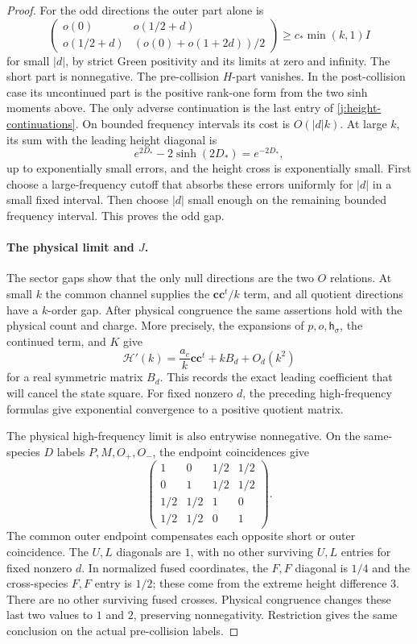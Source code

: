 \begin{proof}
For the odd directions the outer part alone is
\[
\begin{pmatrix}
o(0)&o(1/2+d)\\
o(1/2+d)&(o(0)+o(1+2d))/2
\end{pmatrix}\ge c_*\min(k,1)I
\]
for small \(|d|\), by strict Green positivity and its limits at zero and infinity. The short part is nonnegative. The pre-collision \(H\)-part vanishes. In the post-collision case its uncontinued part is the positive rank-one form from the two sinh moments above. The only adverse continuation is the last entry of \eqref{j:height-continuations}. On bounded frequency intervals its cost is \(O(|d|k)\). At large \(k\), its sum with the leading height diagonal is
\[
e^{2D_*}-2\sinh(2D_*)=e^{-2D_*},
\]
up to exponentially small errors, and the height cross is exponentially small. First choose a large-frequency cutoff that absorbs these errors uniformly for \(|d|\) in a small fixed interval. Then choose \(|d|\) small enough on the remaining bounded frequency interval. This proves the odd gap.

\paragraph{The physical limit and \(J\).}
The sector gaps show that the only null directions are the two \(O\) relations. At small \(k\) the common channel supplies the \(\boldsymbol c\boldsymbol c^t/k\) term, and all quotient directions have a \(k\)-order gap. After physical congruence the same assertions hold with the physical count and charge. More precisely, the expansions of \(p,o,\mathsf h_\sigma\), the continued term, and \(K\) give
\[
\mathcal H'(k)=\frac{a_c}{k}\boldsymbol c\boldsymbol c^t+kB_d+O_d(k^2)
\]
for a real symmetric matrix \(B_d\). This records the exact leading coefficient that will cancel the state square. For fixed nonzero \(d\), the preceding high-frequency formulas give exponential convergence to a positive quotient matrix.

The physical high-frequency limit is also entrywise nonnegative. On the same-species \(D\) labels \(P,M,O_+,O_-\), the endpoint coincidences give
\[
\begin{pmatrix}
1&0&1/2&1/2\\
0&1&1/2&1/2\\
1/2&1/2&1&0\\
1/2&1/2&0&1
\end{pmatrix}.
\]
The common outer endpoint compensates each opposite short or outer coincidence. The \(U,L\) diagonals are \(1\), with no other surviving \(U,L\) entries for fixed nonzero \(d\). In normalized fused coordinates, the \(F,F\) diagonal is \(1/4\) and the cross-species \(F,F\) entry is \(1/2\); these come from the extreme height difference \(3\). There are no other surviving fused crosses. Physical congruence changes these last two values to \(1\) and \(2\), preserving nonnegativity. Restriction gives the same conclusion on the actual pre-collision labels.


\end{proof}
